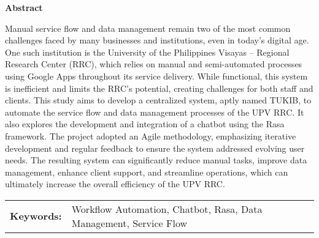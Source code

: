 \begin{center}
\textbf{Abstract}
\end{center}
\setlength{\parindent}{0pt}
Manual service flow and data management remain two of the most common challenges faced by many businesses and institutions, even in today’s digital age. One such institution is the University of the Philippines Visayas – Regional Research Center (RRC), which relies on manual and semi-automated processes using Google Apps throughout its service delivery. While functional, this system is inefficient and limits the RRC’s potential, creating challenges for both staff and clients. This study aims to develop a centralized system, aptly named TUKIB, to automate the service flow and data management processes of the UPV RRC. It also explores the development and integration of a chatbot using the Rasa framework. The project adopted an Agile methodology, emphasizing iterative development and regular feedback to ensure the system addressed evolving user needs. The resulting system can significantly reduce manual tasks, improve data management, enhance client support, and streamline operations, which can ultimately increase the overall efficiency of the UPV RRC.

\begin{tabular}{lp{4.25in}}
\hspace{-0.5em}\textbf{Keywords:}\hspace{0.25em} & Workflow Automation, Chatbot, Rasa, Data Management, Service Flow\\
\end{tabular}